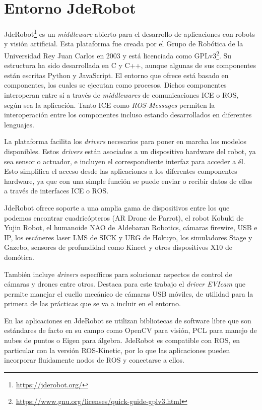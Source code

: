\section{Entorno JdeRobot}
JdeRobot\footnote{\url{https://jderobot.org/}} es un \textit{middleware} abierto para el desarrollo de aplicaciones con robots y visión artificial. Esta plataforma fue creada por el Grupo de Robótica de la Universidad Rey Juan Carlos en 2003 y está licenciada como GPLv3\footnote{\url{https://www.gnu.org/licenses/quick-guide-gplv3.html}}.
Su estructura ha sido desarrollada en C y C++, aunque algunas de sus componentes están escritas Python y JavaScript. El entorno que ofrece está basado en componentes, los cuales se ejecutan como procesos. Dichos componentes interoperan entre sí a través de \textit{middlewares} de comunicaciones ICE o  ROS, según sea la aplicación. Tanto ICE como \textit{ROS-Messages} permiten la interoperación entre los componentes incluso estando desarrollados en diferentes lenguajes.

La plataforma facilita los \textit{drivers} necesarios para poner en marcha los modelos disponibles. Estos \textit{drivers} están asociados a un dispositivo hardware del robot, ya sea sensor o actuador, e incluyen el correspondiente interfaz para acceder a él. Esto simplifica el acceso desde las aplicaciones a los diferentes componentes hardware, ya que con una simple función se puede enviar o recibir datos de ellos a través de interfaces ICE o ROS.

JdeRobot ofrece soporte a una amplia gama de dispositivos entre los que podemos encontrar cuadricópteros (AR Drone de Parrot), el robot Kobuki de Yujin Robot, el humanoide NAO de Aldebaran Robotics, cámaras firewire, USB e IP, los escáneres laser LMS de SICK y URG de Hokuyo, los simuladores Stage y Gazebo, sensores de profundidad como Kinect y otros dispositivos X10 de domótica. 

También incluye \textit{drivers} específicos para solucionar aspectos de control de cámaras y drones entre otros. Destaca para este trabajo el \textit{driver EVIcam} que permite manejar el cuello mecánico de cámaras USB móviles, de utilidad para la primera de las prácticas que se va a incluir en el entorno.

En las aplicaciones en JdeRobot se utilizan bibliotecas de software libre que son estándares de facto en su campo como OpenCV para visión, PCL para manejo de nubes de puntos o Eigen para álgebra. JdeRobot es compatible con ROS, en particular con la versión ROS-Kinetic, por lo que las aplicaciones pueden incorporar fluidamente nodos de ROS y conectarse a ellos.

